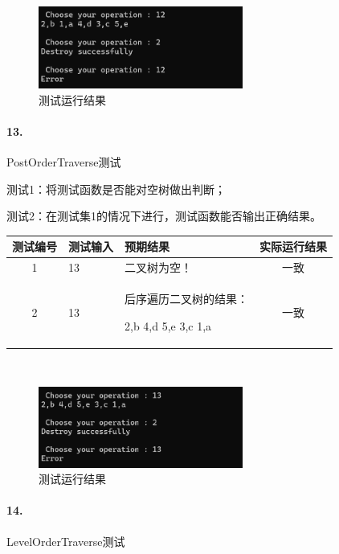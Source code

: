 \documentclass[supercite]{Experimental_Report}
\theoremstyle{definition}
\begin{document}
~\

\begin{figure}[H]
 	\centering
 	\includegraphics[width=0.6\textwidth]{images/二叉树测试12.png}
 	\caption{测试运行结果}
 	\label{txlab}
 \end{figure}

\paragraph{13.}PostOrderTraverse测试

测试1：将测试函数是否能对空树做出判断；

测试2：在测试集1的情况下进行，测试函数能否输出正确结果。

\vspace{0.5em}

\begin{tabular}{|c|p{2.7cm}|p{4.5cm}|c|}
	\hline
	测试编号 & 测试输入 & 预期结果 & 实际运行结果 \\
	\hline
	1 & 13 & 二叉树为空！ & 一致 \\
	\hline
	2 & 13 & 后序遍历二叉树的结果：
 
2,b 4,d 5,e 3,c 1,a & 一致 \\
	\hline
\end{tabular}

~\

\begin{figure}[H]
 	\centering
 	\includegraphics[width=0.6\textwidth]{images/二叉树测试13.png}
 	\caption{测试运行结果}
 	\label{txlab}
 \end{figure}

\paragraph{14.}LevelOrderTraverse测试
\end{document}
